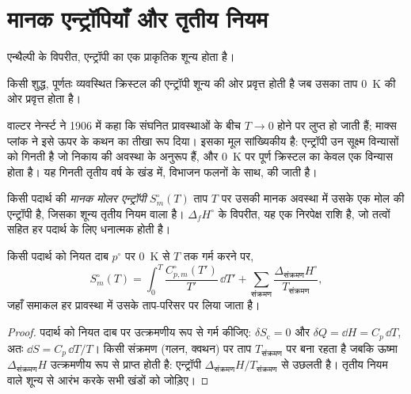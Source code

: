 \section{मानक एन्ट्रॉपियाँ और तृतीय नियम}

एन्थैल्पी के विपरीत, एन्ट्रॉपी का एक प्राकृतिक शून्य होता है।

\begin{theorem}[ऊष्मागतिकी का तृतीय नियम]\label{thm:b2:reaction-free-energy:third-law}
किसी शुद्ध, पूर्णतः व्यवस्थित क्रिस्टल की एन्ट्रॉपी शून्य की ओर प्रवृत्त होती है
जब उसका ताप \qty{0}{K} की ओर प्रवृत्त होता है।
\end{theorem}
\admitted

\begin{remark}[शून्य कहाँ से आता है]\label{rem:b2:reaction-free-energy:third-law}
वाल्टर नेर्न्स्ट ने 1906 में कहा कि संघनित प्रावस्थाओं के बीच  $T \to 0$ होने पर लुप्त हो जाती हैं; माक्स प्लांक ने इसे ऊपर के
कथन का तीखा रूप दिया। इसका मूल सांख्यिकीय है: एन्ट्रॉपी उन सूक्ष्म
विन्यासों को गिनती है जो निकाय की अवस्था के अनुरूप हैं, और \qty{0}{K} पर
पूर्ण क्रिस्टल का केवल एक विन्यास होता है। यह गिनती तृतीय वर्ष के खंड में,
विभाजन फलनों के साथ, की जाती है।
\end{remark}

\begin{definition}[मानक मोलर एन्ट्रॉपी]\label{def:b2:reaction-free-energy:standard-entropy}
किसी पदार्थ की \emph{मानक मोलर एन्ट्रॉपी}
$S^\circ_m(T)$ ताप $T$ पर उसकी मानक अवस्था में उसके एक मोल की
एन्ट्रॉपी है, जिसका शून्य तृतीय नियम वाला है।
$\Delta_f H^\circ$ के विपरीत, यह एक निरपेक्ष राशि है, जो तत्वों सहित हर
पदार्थ के लिए धनात्मक होती है।
\end{definition}

\begin{proposition}[ऊष्मा धारिताओं से निरपेक्ष एन्ट्रॉपी]\label{prop:b2:reaction-free-energy:absolute-entropy}
किसी पदार्थ को नियत दाब $p^\circ$ पर \qty{0}{K} से $T$ तक गर्म करने पर,
\[
  S^\circ_m(T) = \int_0^T\frac{C^\circ_{p,m}(T')}{T'}\,\dd T' +
  \sum_{\text{संक्रमण}}\frac{\Delta_{\text{संक्रमण}}H^\circ}{T_{\text{संक्रमण}}} ,
\]
जहाँ समाकल हर प्रावस्था में उसके ताप-परिसर पर लिया जाता है।
\end{proposition}

\begin{proof}
पदार्थ को नियत दाब पर उत्क्रमणीय रूप से गर्म कीजिए: $\delta S_{\text{c}} =
0$ और $\delta Q = \dd H = C_p\,\dd T$, अतः $\dd S = C_p\,\dd T/T$। किसी
संक्रमण (गलन, क्वथन) पर ताप $T_{\text{संक्रमण}}$ पर बना रहता है
जबकि ऊष्मा $\Delta_{\text{संक्रमण}}H$ उत्क्रमणीय रूप से प्राप्त होती है: एन्ट्रॉपी
$\Delta_{\text{संक्रमण}}H/T_{\text{संक्रमण}}$ से उछलती है। तृतीय नियम वाले शून्य से
आरंभ करके सभी खंडों को जोड़िए।
\end{proof}


